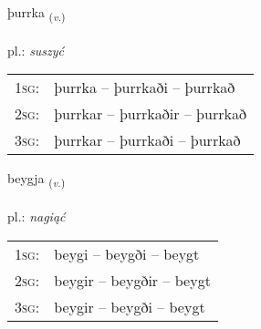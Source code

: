 \documentclass[frontgrid, backgrid]{flacards}\usepackage[]{graphicx}\usepackage[]{xcolor}
\begin{document}
\renewcommand{\flhead}{\vskip5pt \fboxsep=0pt {\small\bfseries\footnotesize Sagnorð | czasownik}}
\renewcommand{\fcfoot}{\vskip5pt \fboxsep=0pt \hspace{2pt}{\small\bfseries\footnotesize 3K}}

\renewcommand{\blhead}{\vskip5pt {\small\bfseries\footnotesize Sagnorð | czasownik }}
\renewcommand{\bcfoot}{\vskip5pt \hspace{2pt}{\small\bfseries\footnotesize 3K}}


{þurrka \small{\textsubscript{(\textit{v.})}} \\[1ex] %
\textphonetic{[θʏr̥ka]} \\
pl.: \emph{suszyć} \\  [2ex]
\renewcommand*{\arraystretch}{0.8}
\begin{tabular}{p{1cm}l}
\textsc{1sg}: & þurrka -- þurrkaði -- þurrkað \\ 
\textsc{2sg}: & þurrkar -- þurrkaðir -- þurrkað \\ 
\textsc{3sg}: & þurrkar -- þurrkaði -- þurrkað \\ 
\end{tabular}
}

\renewcommand{\flhead}{\vskip5pt \fboxsep=0pt {\small\bfseries\footnotesize Sagnorð | czasownik}}
\renewcommand{\fcfoot}{\vskip5pt \fboxsep=0pt \hspace{2pt}{\small\bfseries\footnotesize 3K}}

\renewcommand{\blhead}{\vskip5pt {\small\bfseries\footnotesize Sagnorð | czasownik }}
\renewcommand{\bcfoot}{\vskip5pt \hspace{2pt}{\small\bfseries\footnotesize 3K}}


{beygja \small{\textsubscript{(\textit{v.})}} \\[1ex] %
\textphonetic{[peija]} \\
pl.: \emph{nagiąć} \\  [2ex]
\renewcommand*{\arraystretch}{0.8}
\begin{tabular}{p{1cm}l}
\textsc{1sg}: & beygi -- beygði -- beygt \\ 
\textsc{2sg}: & beygir -- beygðir -- beygt \\ 
\textsc{3sg}: & beygir -- beygði -- beygt \\ 
\end{tabular}
}
\end{document}
